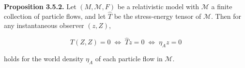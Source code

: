 \textbf{Proposition 3.5.2.} Let $(M, \mathcal{M}, F)$ be a relativistic model with $\mathcal{M}$ a finite collection of particle flows, and let $\hat{T}$ be the stress-energy tensor of $\mathcal{M}$. Then for any instantaneous observer $(z, Z)$,

$$T(Z, Z) = 0 \;\Longleftrightarrow\; \hat{T}z = 0 \;\Longleftrightarrow\; \eta_A z = 0$$

holds for the world density $\eta_A$ of each particle flow in $\mathcal{M}$.
